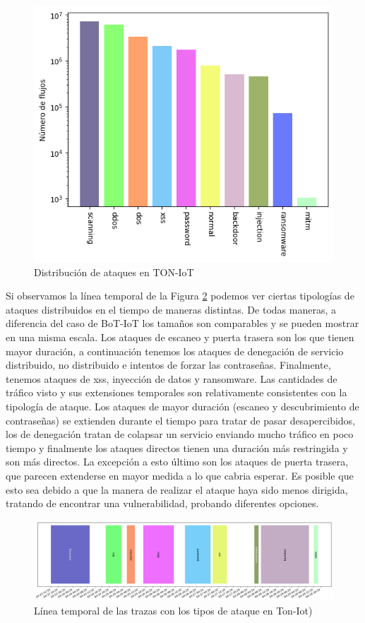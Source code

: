 \begin{figure}[H]
  \begin{center}
      \includegraphics[width=0.49\linewidth]{media/toniot_csv_results.png}
  \end{center}
  \captionsetup{justification=centering}
  \caption{Distribución de ataques en TON-IoT}\label{fig:toniot_results}
\end{figure}

Si observamos la línea temporal de la Figura \ref{fig:toniot_timeline} podemos ver ciertas tipologías de ataques distribuidos en el tiempo de maneras distintas. De todas maneras, a diferencia del caso de BoT-IoT los tamaños son comparables y se pueden mostrar en una misma escala. Los ataques de escaneo y puerta trasera son los que tienen mayor duración, a continuación tenemos los ataques de denegación de servicio distribuido, no distribuido e intentos de forzar las contraseñas. Finalmente, tenemos ataques de xss, inyección de datos y ransomware. Las cantidades de tráfico visto y sus extensiones temporales son relativamente consistentes con la tipología de ataque. Los ataques de mayor duración (escaneo y descubrimiento de contraseñas) se extienden durante el tiempo para tratar de pasar desapercibidos, los de denegación tratan de colapsar un servicio enviando mucho tráfico en poco tiempo y finalmente los ataques directos tienen una duración más restringida y son más directos. La excepción a esto último son los ataques de puerta trasera, que parecen extenderse en mayor medida a lo que cabria esperar. Es posible que esto sea debido a que la manera de realizar el ataque haya sido menos dirigida, tratando de encontrar una vulnerabilidad, probando diferentes opciones.

\begin{figure}[!htb]
  \begin{center}
      \includegraphics[width=1\linewidth]{media/toniot_csv_timeline.png}
  \end{center}
  \captionsetup{justification=centering}
  \caption{Línea temporal de las trazas con los tipos de ataque en Ton-Iot)}\label{fig:toniot_timeline}
\end{figure}

